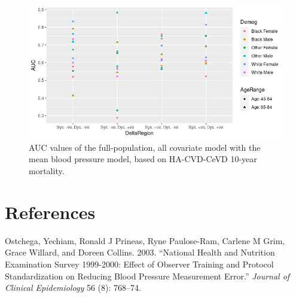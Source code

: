 \documentclass[
]{article}
\newlength{\cslhangindent}
\newlength{\cslentryspacingunit} %
\newenvironment{CSLReferences}[2] %
 {%
  \setlength{\parindent}{0pt}
  \ifodd #1
  \let\oldpar\par
  \def\par{\hangindent=\cslhangindent\oldpar}
  \fi
  \setlength{\parskip}{#2\cslentryspacingunit}
 }%
 {}
\begin{document}
\begin{figure}
\hypertarget{fig:DeltaAUCs}{%
\centering
\includegraphics{./Rmarkdown_Plots/DeltaDirection_AUCs.png}
\caption{AUC values of the full-population, all covariate model with the mean blood pressure model, based on HA-CVD-CeVD 10-year mortality.}\label{fig:DeltaAUCs}
}
\end{figure}

\hypertarget{references}{%
\section*{References}\label{references}}

\hypertarget{refs}{}
\begin{CSLReferences}{1}{0}
\leavevmode{}%
Ostchega, Yechiam, Ronald J Prineas, Ryne Paulose-Ram, Carlene M Grim, Grace Willard, and Doreen Collins. 2003. {``National Health and Nutrition Examination Survey 1999-2000: Effect of Observer Training and Protocol Standardization on Reducing Blood Pressure Measurement Error.''} \emph{Journal of Clinical Epidemiology} 56 (8): 768--74.

\end{CSLReferences}
\end{document}
